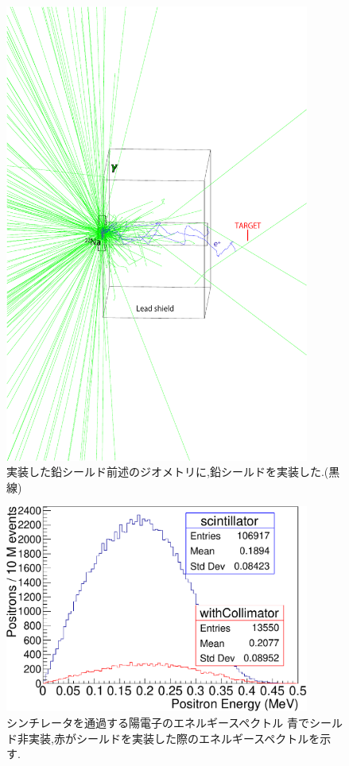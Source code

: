 \begin{figure}[!tbp]
	\centering
		\includegraphics[width=10cm]{img/test1b_geometry.pdf}
	\caption[実装した鉛シールド]{実装した鉛シールド\newline 前述のジオメトリに,鉛シールドを実装した.(黒線)}
	\label{test1b_geometry}
\end{figure}

\begin{figure}[!tbp]
	\centering
		\includegraphics[width=10cm]{fig/collimator_loss.pdf}
	\caption[シンチレータを通過する陽電子のエネルギースペクトル] {シンチレータを通過する陽電子のエネルギースペクトル \newline 青でシールド非実装,赤がシールドを実装した際のエネルギースペクトルを示す.}
	\label{collimator_loss}
\end{figure}

